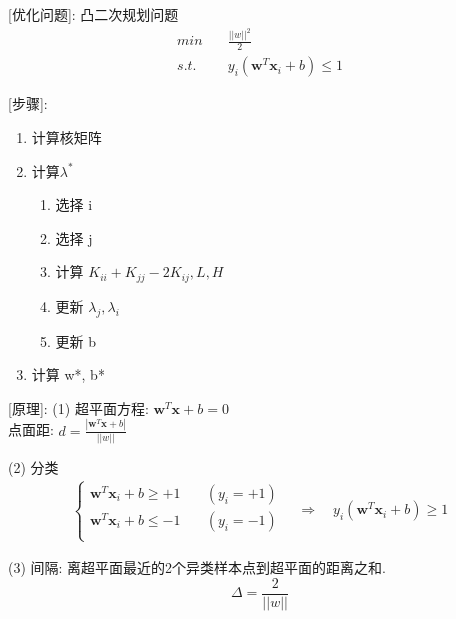 \documentclass{article}
\begin{document}
		[优化问题]: 凸二次规划问题
		    \begin{align*}
		        min     &\quad	\frac{||w||^2}{2}\\
				s.t.    &\quad	y_i (\boldsymbol w^T \boldsymbol x_i + b) \le 1
		    \end{align*}

		[步骤]:
            \begin{enumerate}
                \item 计算核矩阵
                \item 计算$\lambda^*$
                \begin{enumerate}
                    \item 选择 i
                    \item 选择 j
                    \item 计算 $K_{ii}+K_{jj}-2K_{ij}, L, H$
                    \item 更新 $\lambda_j, \lambda_i$
                    \item 更新 b
                \end{enumerate}
                \item 计算 w*, b*
            \end{enumerate}

		[原理]:
			(1) 超平面方程: $\boldsymbol w^T \boldsymbol x + b = 0$\\
				点面距: $d = \frac{|\boldsymbol w^T \boldsymbol x + b|}{||w||}$
				
			(2) 分类
			\begin{align*}\left \{ \begin{array}{cc}
				\boldsymbol w^T \boldsymbol x_i + b \ge +1    &\quad (y_i = +1)\\
				\boldsymbol w^T \boldsymbol x_i + b \le -1	&\quad (y_i = -1)\\
			    \end{array} \right.
				\quad\Rightarrow\quad y_i (\boldsymbol w^T \boldsymbol x_i + b) \ge 1
			\end{align*}

			(3) 间隔: 离超平面最近的2个异类样本点到超平面的距离之和.
					$$\Delta = \frac{2}{||w||}$$
					
\end{document}

